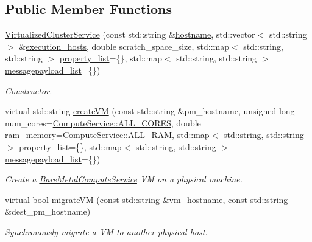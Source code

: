 \subsection*{Public Member Functions}
\begin{DoxyCompactItemize}
\item 
\hyperlink{classwrench_1_1_virtualized_cluster_service_a7be5224d65410f4570ce9f9e9c835bd5}{Virtualized\+Cluster\+Service} (const std\+::string \&\hyperlink{classwrench_1_1_s4_u___daemon_a52bc0b9a6cd248310749dac086819f00}{hostname}, std\+::vector$<$ std\+::string $>$ \&\hyperlink{classwrench_1_1_cloud_service_a8225cae457e491f3f3aad32653910ea0}{execution\+\_\+hosts}, double scratch\+\_\+space\+\_\+size, std\+::map$<$ std\+::string, std\+::string $>$ \hyperlink{classwrench_1_1_service_a032143b1e2d7296dde9b4ca1e34845ce}{property\+\_\+list}=\{\}, std\+::map$<$ std\+::string, std\+::string $>$ \hyperlink{classwrench_1_1_service_a63865f20c92027ab626ab1347b0099d2}{messagepayload\+\_\+list}=\{\})
\begin{DoxyCompactList}\small\item\em Constructor. \end{DoxyCompactList}\item 
virtual std\+::string \hyperlink{classwrench_1_1_virtualized_cluster_service_afb90d549ca85f41946b155cff49e37ce}{create\+VM} (const std\+::string \&pm\+\_\+hostname, unsigned long num\+\_\+cores=\hyperlink{classwrench_1_1_compute_service_a1160f521623440ad4e0e0823e08a7d22}{Compute\+Service\+::\+A\+L\+L\+\_\+\+C\+O\+R\+ES}, double ram\+\_\+memory=\hyperlink{classwrench_1_1_compute_service_abc4fe0bad59f544b4b34d0e7d4012d44}{Compute\+Service\+::\+A\+L\+L\+\_\+\+R\+AM}, std\+::map$<$ std\+::string, std\+::string $>$ \hyperlink{classwrench_1_1_service_a032143b1e2d7296dde9b4ca1e34845ce}{property\+\_\+list}=\{\}, std\+::map$<$ std\+::string, std\+::string $>$ \hyperlink{classwrench_1_1_service_a63865f20c92027ab626ab1347b0099d2}{messagepayload\+\_\+list}=\{\})
\begin{DoxyCompactList}\small\item\em Create a \hyperlink{classwrench_1_1_bare_metal_compute_service}{Bare\+Metal\+Compute\+Service} VM on a physical machine. \end{DoxyCompactList}\item 
virtual bool \hyperlink{classwrench_1_1_virtualized_cluster_service_a0a81357e7af9b42bbb7b376c56a90611}{migrate\+VM} (const std\+::string \&vm\+\_\+hostname, const std\+::string \&dest\+\_\+pm\+\_\+hostname)
\begin{DoxyCompactList}\small\item\em Synchronously migrate a VM to another physical host. \end{DoxyCompactList}\end{DoxyCompactItemize}
